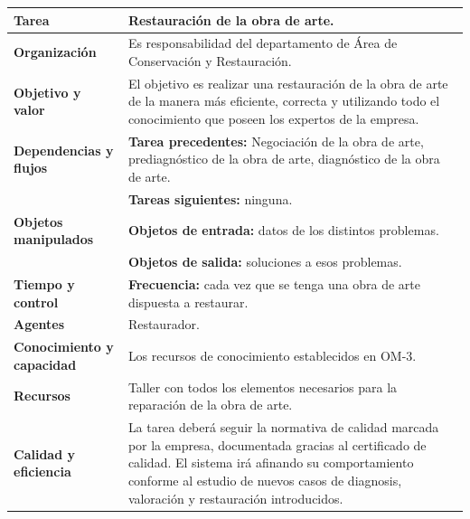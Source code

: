 \documentclass[a4paper,11pt]{article}
\begin{document}
			\newpage
			\begin{center}
				\begin{tabular}{| l | p{6.5cm} |}
					\hline
					\cellcolor[RGB]{224,233,250}\textbf{Tarea} & Restauración de la obra de
					arte.\\
					\hline
					\cellcolor[RGB]{224,233,250}\textbf{Organización} & Es responsabilidad del
					departamento de Área de Conservación y Restauración.\\
					\hline
					\cellcolor[RGB]{224,233,250}\textbf{Objetivo y valor} & El objetivo es
					realizar una restauración de la obra de arte de la manera más eficiente, correcta y utilizando todo el conocimiento que poseen los expertos de la empresa.\\
					\hline
					\cellcolor[RGB]{224,233,250}\textbf{Dependencias y flujos} & \textbf{Tarea
					precedentes:} Negociación de la obra de arte, prediagnóstico de la obra de arte, diagnóstico de la obra de arte.\\
					\cellcolor[RGB]{224,233,250}& \textbf{Tareas siguientes:} ninguna.\\
					\hline
					\cellcolor[RGB]{224,233,250}\textbf{Objetos manipulados} & \textbf{Objetos
					de entrada:} datos de los distintos problemas.\\
					\cellcolor[RGB]{224,233,250}& \textbf{Objetos de salida:} soluciones a esos
					problemas.\\
					\hline
					\cellcolor[RGB]{224,233,250}\textbf{Tiempo y control} &
					\textbf{Frecuencia:} cada vez que se tenga una obra de arte dispuesta a restaurar.\\
					\hline
					\cellcolor[RGB]{224,233,250}\textbf{Agentes} & Restaurador.\\
					\hline
					\cellcolor[RGB]{224,233,250}\textbf{Conocimiento y capacidad} & Los
					recursos de conocimiento establecidos en OM-3.\\
					\hline
					\cellcolor[RGB]{224,233,250}\textbf{Recursos} & Taller con todos los
					elementos necesarios para la reparación de la obra de arte.\\
					\hline
					\cellcolor[RGB]{224,233,250}\textbf{Calidad y eficiencia} & La tarea deberá
					seguir la normativa de calidad marcada por la empresa, documentada gracias al certificado de calidad. El sistema irá afinando su comportamiento conforme al estudio de nuevos casos de diagnosis, valoración y restauración introducidos.\\
					\hline
				\end{tabular}
			\end{center}
			\newpage
\end{document}
